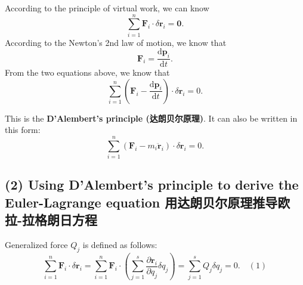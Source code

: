 According to the principle of virtual work, we can know
\[\sum_{i = 1}^{n} \boldsymbol{F}_i \cdot \delta \boldsymbol{r}_i = \boldsymbol{0}.\]
According to the Newton's 2nd law of motion, we know that
\[\boldsymbol{F}_i = \frac{\mathrm{d} \boldsymbol{p}_i}{\mathrm{d}t}.\]
From the two equations above, we know that
\[\sum_{i = 1}^{n} \left( \boldsymbol{F}_i - \frac{\mathrm{d} \boldsymbol{p}_i}{\mathrm{d}t} \right) \cdot \delta \boldsymbol{r}_i = 0.\]

This is the \textbf{D'Alembert's principle (达朗贝尔原理)}. It can also
be written in this form:
\[\sum_{i = 1}^{n} \left( \boldsymbol{F}_i - m_i \ddot{\boldsymbol{r}}_i \right) \cdot \delta \boldsymbol{r}_i = 0.\]

\subsection*{(2) Using D'Alembert's principle to derive the
Euler-Lagrange equation
用达朗贝尔原理推导欧拉-拉格朗日方程}\label{using-dalmberts-principle-to-derive-the-euler-lagrange-equation-ux7528ux8fbeux6717ux8d1dux5c14ux539fux7406ux63a8ux5bfcux6b27ux62c9-ux62c9ux683cux6717ux65e5ux65b9ux7a0b}

Generalized force \(Q_j\) is defined as follows:
\[\sum_{i = 1}^{n} \boldsymbol{F}_i \cdot \delta \boldsymbol{r}_i = \sum_{i = 1}^{n} \boldsymbol{F}_i \cdot \left( \sum_{j = 1}^{s} \frac{\partial \boldsymbol{r}_i}{\partial q_j} \delta q_j \right) = \sum_{j = 1}^{s} Q_j \delta q_j = 0. \quad(1)\]

